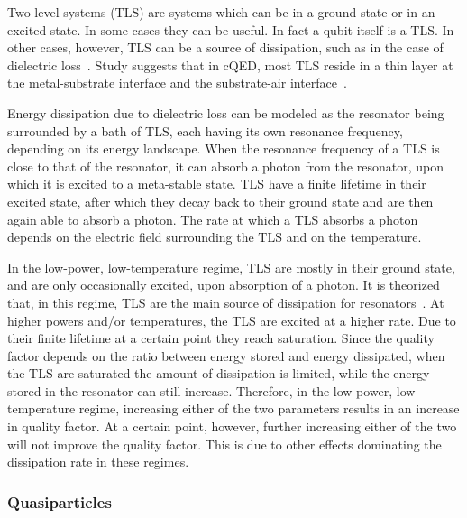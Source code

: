       Two-level systems (TLS) are systems which can be in a ground state or in an excited state. In some cases they can be useful. In fact a qubit itself is a TLS. In other cases, however, TLS can be a source of dissipation, such as in the case of dielectric loss~\cite{martinis2014ucsb}. Study suggests that in cQED, most TLS reside in a thin layer at the metal-substrate interface and the substrate-air interface~\cite{wenner2011surface}.

      Energy dissipation due to dielectric loss can be modeled as the resonator being surrounded by a bath of TLS, each having its own resonance frequency, depending on its energy landscape. When the resonance frequency of a TLS is close to that of the resonator, it can absorb a photon from the resonator, upon which it is excited to a meta-stable state. TLS have a finite lifetime in their excited state, after which they decay back to their ground state and are then again able to absorb a photon. The rate at which a TLS absorbs a photon depends on the electric field surrounding the TLS and on the temperature.

      In the low-power, low-temperature regime, TLS are mostly in their ground state, and are only occasionally excited, upon absorption of a photon. It is theorized that, in this regime, TLS are the main source of dissipation for resonators~\cite{gao2008experimental}. At higher powers and/or temperatures, the TLS are excited at a higher rate. Due to their finite lifetime at a certain point they reach saturation. Since the quality factor depends on the ratio between energy stored and energy dissipated, when the TLS are saturated the amount of dissipation is limited, while the energy stored in the resonator can still increase. Therefore, in the low-power, low-temperature regime, increasing either of the two parameters results in an increase in quality factor. At a certain point, however, further increasing either of the two will not improve the quality factor. This is due to other effects dominating the dissipation rate in these regimes.




    \subsubsection{Quasiparticles}

